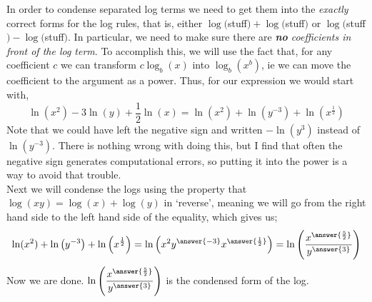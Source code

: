 \documentclass{ximera}
\begin{document}
    \begin{example}%
    
        In order to condense separated log terms we need to get them into the \textit{exactly} correct forms for the log rules, that is, either $\log($stuff$) + \log($stuff$)$ or $\log($stuff$) - \log($stuff$)$. In particular, we need to make sure there are \textit{\textbf{no} coefficients in front of the log term}. To accomplish this, we will use the fact that, for any coefficient $c$ we can transform $c\log_b(x)$ into $\log_b(x^b)$, ie we can move the coefficient to the argument as a power. Thus, for our expression we would start with,
        \[
            \ln(x^2) - 3\ln(y) + \frac{1}{2}\ln(x) = \ln(x^2) + \ln\left(y^{-3}\right) + \ln\left(x^{\frac{1}{2}}\right)
        \]
        Note that we could have left the negative sign and written $- \ln(y^3)$ instead of $\ln(y^{-3})$. There is nothing wrong with doing this, but I find that often the negative sign generates computational errors, so putting it into the power is a way to avoid that trouble.\\
        
        Next we will condense the logs using the property that $\log(xy) = \log(x) + \log(y)$ in `reverse', meaning we will go from the right hand side to the left hand side of the equality, which gives us;
        \[
            \ln(x^2) + \ln\left(y^{-3}\right) + \ln\left(x^{\frac{1}{2}}\right) = 
            \ln\left( x^2y^{\answer{-3}}x^{\answer{\frac{1}{2}}} \right) = 
            \ln\left(\dfrac{x^{\answer{\frac{5}{2}}}}{y^{\answer{3}}}\right)
        \]
        Now we are done. $\ln\left(\dfrac{x^{\answer{\frac{5}{2}}}}{y^{\answer{3}}}\right)$ is the condensed form of the log. 
    \end{example}%

%    
%
%
%
%
%
\end{document}
